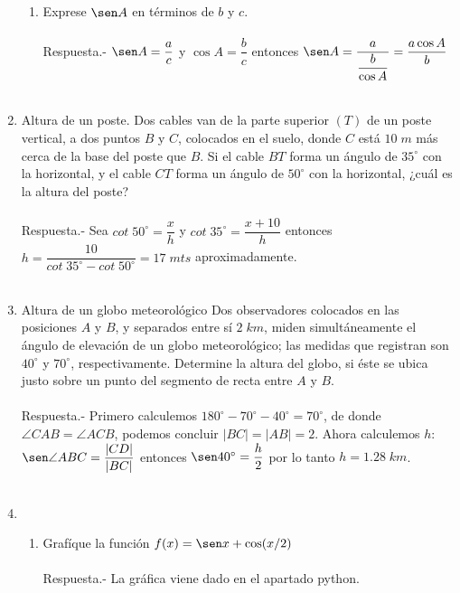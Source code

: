 \begin{enumerate}
\begin{enumerate}[\bfseries a)]
    \item Exprese $\sen A$ en términos de $b$ y $c$.\\\\ 
	Respuesta.-\; $\sen A = \dfrac{a}{c}$ y $\cos A = \dfrac{b}{c}$ entonces $\sen A = \dfrac{a}{\dfrac{b}{\cos A}} = \dfrac{a\cos A}{b}$\\\\

\end{enumerate}

\item Altura de un poste. Dos cables van de la parte superior $(T)$ de un poste vertical, a dos puntos $B$ y $C$, colocados en el suelo, donde $C$ está $10\; m$ más cerca de la base del poste que $B$. Si el cable $BT$ forma un ángulo de $35^{\circ}$ con la horizontal, y el cable $CT$ forma un ángulo de $50^{\circ}$ con la horizontal, ¿cuál es la altura del poste?\\\\
    Respuesta.-\; Sea $cot\; 50^\circ = \dfrac{x}{h}$ y $cot\; 35^\circ = \dfrac{x+10}{h}$ entonces $h = \dfrac{10}{cot\; 35^\circ - cot\; 50^\circ} = 17 \; mts$ aproximadamente.\\\\

\item Altura de un globo meteorológico Dos observadores colocados en las posiciones $A$ y $B$, y separados entre sí $2 \; km$, miden simultáneamente el ángulo de elevación de un globo meteorológico; las medidas que registran son $40^\circ$ y $70^\circ$, respectivamente. Determine la altura del globo, si éste se ubica justo sobre un punto del segmento de recta entre $A$ y $B$.\\\\
    Respuesta.-\; Primero calculemos $180^\circ - 70^\circ - 40^\circ = 70^\circ$, de donde $\angle CAB = \angle ACB$, podemos concluir $|BC| = |AB| = 2$. Ahora calculemos $h$:\\
    $\sen \angle ABC = \dfrac{|CD|}{|BC|}$ entonces $\sen 40^\circ = \dfrac{h}{2}$ por lo tanto $h=1.28\; km$.\\\\

\item 
\begin{enumerate}[\bfseries a)]

    \item Grafíque la función $f(x) = \sen x + \cos (x/2)$\\\\
	Respuesta.-\; La gráfica viene dado en el apartado python.\\\\


\end{enumerate}
\end{enumerate}

